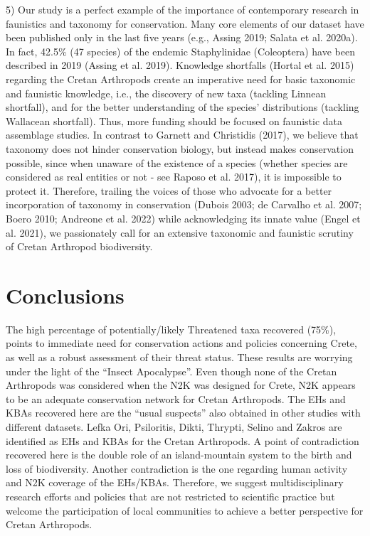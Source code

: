 5) Our study is a perfect example of the importance of contemporary research in
faunistics and taxonomy for conservation. Many core elements of our dataset
have been published only in the last five years (e.g., Assing 2019; Salata et al. 2020a).
In fact, 42.5\% (47 species) of the endemic Staphylinidae (Coleoptera) have
been described in 2019 (Assing et al. 2019). Knowledge shortfalls (Hortal et al. 2015)
regarding the Cretan Arthropods create an imperative need for basic taxonomic
and faunistic knowledge, i.e., the discovery of new taxa (tackling Linnean shortfall),
and for the better understanding of the species’ distributions (tackling Wallacean shortfall).
Thus, more funding should be focused on faunistic data assemblage studies.
In contrast to Garnett and Christidis (2017), we believe that taxonomy does not
hinder conservation biology, but instead makes conservation possible,
since when unaware of the existence of a species (whether species are
considered as real entities or not - see Raposo et al. 2017), it is impossible
to protect it. Therefore, trailing the voices of those who advocate for a
better incorporation of taxonomy in conservation (Dubois 2003; de Carvalho et al. 2007; Boero 2010; Andreone et al. 2022)
while acknowledging its innate value (Engel et al. 2021), we passionately call
for an extensive taxonomic and faunistic scrutiny of Cretan Arthropod biodiversity.

\section{Conclusions}
\label{sec:arthropods-conclusions}

The high percentage of potentially/likely Threatened taxa recovered (75\%),
points to immediate need for conservation actions and policies concerning Crete,
as well as a robust assessment of their threat status. These results are
worrying under the light of the “Insect Apocalypse”. Even though none of the
Cretan Arthropods was considered when the N2K was designed for Crete, N2K
appears to be an adequate conservation network for Cretan Arthropods. The EHs
and KBAs recovered here are the “usual suspects” also obtained in other studies
with different datasets. Lefka Ori, Psiloritis, Dikti, Thrypti, Selino and
Zakros are identified as EHs and KBAs for the Cretan Arthropods.  A point of
contradiction recovered here is the double role of an island-mountain system to
the birth and loss of biodiversity. Another contradiction is the one regarding
human activity and N2K coverage of the EHs/KBAs. Therefore, we suggest
multidisciplinary research efforts and policies that are not restricted to
scientific practice but welcome the participation of local communities to
achieve a better perspective for Cretan Arthropods.

